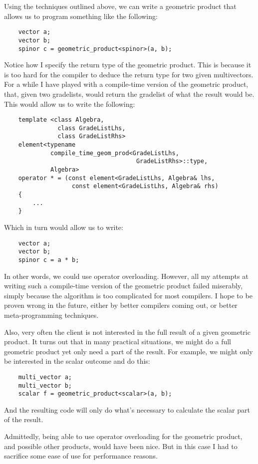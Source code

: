 \documentclass[10pt]{article}
\begin{document}
Using the techniques outlined above, we can write a geometric
product that allows us to program something like the following:
\begin{verbatim}
    vector a;
    vector b;
    spinor c = geometric_product<spinor>(a, b);
\end{verbatim}
Notice how I specify the return type of the geometric product.
This is because it is too hard for the compiler to deduce the
return type for two given multivectors. For a while I have played
with a compile-time version of the geometric product, that, given
two gradelists, would return the gradelist of what the result
would be. This would allow us to write the following:
\begin{verbatim}
    template <class Algebra,
               class GradeListLhs,
               class GradeListRhs>
    element<typename
             compile_time_geom_prod<GradeListLhs,
                                     GradeListRhs>::type,
             Algebra>
    operator * = (const element<GradeListLhs, Algebra& lhs,
                   const element<GradeListLhs, Algebra& rhs)
    {
        ...
    }
\end{verbatim}
Which in turn would allow us to write:
\begin{verbatim}
    vector a;
    vector b;
    spinor c = a * b;
\end{verbatim}
In other words, we could use operator overloading. However, all my
attempts at writing such a compile-time version of the geometric
product failed miserably, simply because the algorithm is too
complicated for most compilers. I hope to be proven wrong in the
future, either by better compilers coming out, or better
meta-programming techniques.

Also, very often the client is not interested in the full result
of a given geometric product. It turns out that in many practical
situations, we might do a full geometric product yet only need a
part of the result. For example, we might only be interested in
the scalar outcome and do this:
\begin{verbatim}
    multi_vector a;
    multi_vector b;
    scalar f = geometric_product<scalar>(a, b);
\end{verbatim}
And the resulting code will only do what's necessary to calculate
the scalar part of the result.

Admittedly, being able to use operator overloading for the
geometric product, and possible other products, would have been
nice. But in this case I had to sacrifice some ease of use for
performance reasons.
\end{document}
